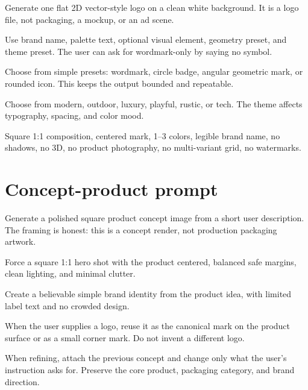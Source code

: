 \documentclass[12pt,a4paper]{report}
\begin{document}
\begin{description}[style=nextline, leftmargin=2cm, labelwidth=1.8cm]
  \item[\textsc{task}] Generate one flat 2D vector-style logo on a clean white background. It is a logo file, not packaging, a mockup, or an ad scene.
  \item[\textsc{inputs}] Use brand name, palette text, optional visual element, geometry preset, and theme preset. The user can ask for wordmark-only by saying no symbol.
  \item[\textsc{geometry}] Choose from simple presets: wordmark, circle badge, angular geometric mark, or rounded icon. This keeps the output bounded and repeatable.
  \item[\textsc{theme}] Choose from modern, outdoor, luxury, playful, rustic, or tech. The theme affects typography, spacing, and color mood.
  \item[\textsc{constraints}] Square 1:1 composition, centered mark, 1--3 colors, legible brand name, no shadows, no 3D, no product photography, no multi-variant grid, no watermarks.
\end{description}

\section{Concept-product prompt}
\label{sec:conceptprompt}

\begin{description}[style=nextline, leftmargin=2cm, labelwidth=1.8cm]
  \item[\textsc{task}] Generate a polished square product concept image from a short user description. The framing is honest: this is a concept render, not production packaging artwork.
  \item[\textsc{composition}] Force a square 1:1 hero shot with the product centered, balanced safe margins, clean lighting, and minimal clutter.
  \item[\textsc{branding}] Create a believable simple brand identity from the product idea, with limited label text and no crowded design.
  \item[\textsc{logo attachment}] When the user supplies a logo, reuse it as the canonical mark on the product surface or as a small corner mark. Do not invent a different logo.
  \item[\textsc{refinement}] When refining, attach the previous concept and change only what the user's instruction asks for. Preserve the core product, packaging category, and brand direction.
\end{description}
\end{document}
